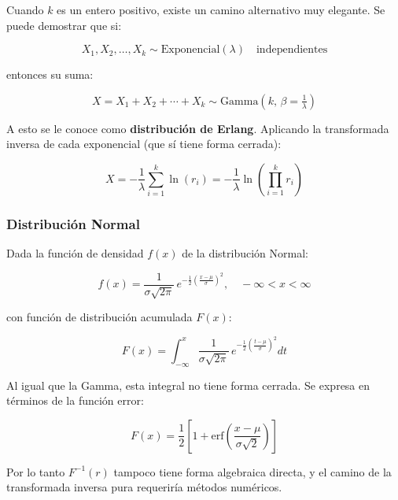 \documentclass{article}
\begin{document}
Cuando $k$ es un entero positivo, existe un camino alternativo muy elegante. Se puede
demostrar que si:

\begin{equation}
    X_1, X_2, \ldots, X_k \sim \mathrm{Exponencial}(\lambda) \quad \text{independientes}
\end{equation}

entonces su suma:

\begin{equation}
    X = X_1 + X_2 + \cdots + X_k \sim \mathrm{Gamma}\!\left(k,\, \beta = \tfrac{1}{\lambda}\right)
\end{equation}

A esto se le conoce como \textbf{distribución de Erlang}. Aplicando la transformada inversa de
cada exponencial (que sí tiene forma cerrada):

\begin{equation}
    X = -\frac{1}{\lambda}\sum_{i=1}^{k} \ln(r_i) = -\frac{1}{\lambda}\ln\!\left(\prod_{i=1}^{k} r_i\right)
\end{equation}


\subsubsection{Distribución Normal}

Dada la función de densidad $f(x)$ de la distribución Normal:

\begin{equation}
    f(x) = \frac{1}{\sigma\sqrt{2\pi}}\, e^{-\frac{1}{2}\left(\frac{x-\mu}{\sigma}\right)^2},
    \quad -\infty < x < \infty
\end{equation}

con función de distribución acumulada $F(x)$:

\begin{equation}
    F(x) = \int_{-\infty}^{x} \frac{1}{\sigma\sqrt{2\pi}}\, e^{-\frac{1}{2}\left(\frac{t-\mu}{\sigma}\right)^2} dt
\end{equation}

Al igual que la Gamma, esta integral no tiene forma cerrada. Se expresa en términos de la
función error:

\begin{equation}
    F(x) = \frac{1}{2}\left[1 + \mathrm{erf}\!\left(\frac{x - \mu}{\sigma\sqrt{2}}\right)\right]
\end{equation}

Por lo tanto $F^{-1}(r)$ tampoco tiene forma algebraica directa, y el camino de la
transformada inversa pura requeriría métodos numéricos.
\end{document}
